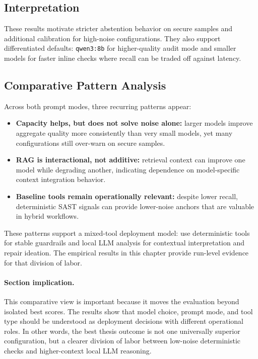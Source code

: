 \subsection*{Interpretation}

These results motivate stricter abstention behavior on secure samples and additional calibration for high-noise configurations. They also support differentiated defaults: \texttt{qwen3:8b} for higher-quality audit mode and smaller models for faster inline checks where recall can be traded off against latency.

\subsection*{Comparative Pattern Analysis}

Across both prompt modes, three recurring patterns appear:
\begin{itemize}
  \item \textbf{Capacity helps, but does not solve noise alone:} larger models improve aggregate quality more consistently than very small models, yet many configurations still over-warn on secure samples.
  \item \textbf{RAG is interactional, not additive:} retrieval context can improve one model while degrading another, indicating dependence on model-specific context integration behavior.
  \item \textbf{Baseline tools remain operationally relevant:} despite lower recall, deterministic SAST signals can provide lower-noise anchors that are valuable in hybrid workflows.
\end{itemize}

These patterns support a mixed-tool deployment model: use deterministic tools for stable guardrails and local LLM analysis for contextual interpretation and repair ideation. The empirical results in this chapter provide run-level evidence for that division of labor.

\paragraph{Section implication.}
This comparative view is important because it moves the evaluation beyond isolated best scores. The results show that model choice, prompt mode, and tool type should be understood as deployment decisions with different operational roles. In other words, the best thesis outcome is not one universally superior configuration, but a clearer division of labor between low-noise deterministic checks and higher-context local LLM reasoning.
